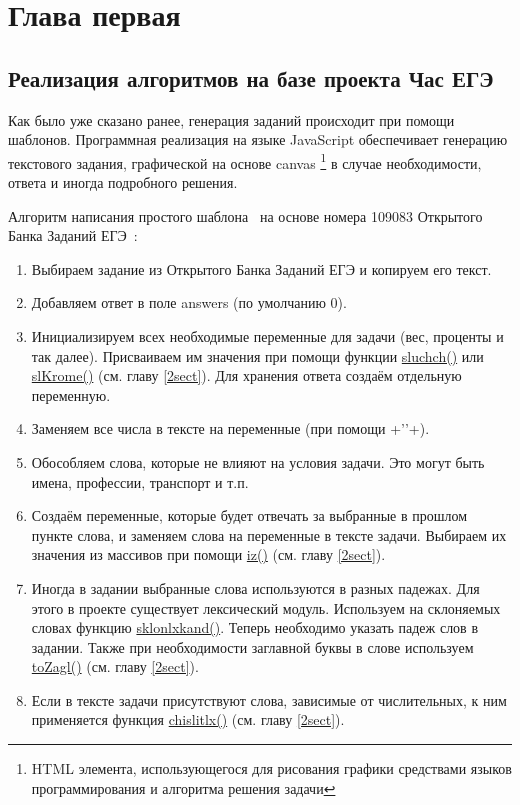 
\section{Глава первая}
\subsection{Реализация алгоритмов на базе проекта Час ЕГЭ}
Как было уже сказано ранее, генерация заданий происходит при помощи шаблонов.
Программная реализация на языке JavaScript обеспечивает генерацию текстового задания,
графической на основе canvas
\footnote{HTML элемента, использующегося для рисования графики средствами языков программирования и алгоритма решения задачи} в случае необходимости,
ответа и иногда подробного решения.

Алгоритм написания простого шаблона~\cite{chasi} на основе номера 109083 Открытого Банка Заданий ЕГЭ~\cite{fipi}:
\begin{enumerate}
    \item Выбираем задание из Открытого Банка Заданий ЕГЭ и копируем его текст.
    \item Добавляем ответ в поле answers (по умолчанию 0).
          
    \item Инициализируем всех необходимые переменные для задачи (вес, проценты и так далее).
          Присваиваем им значения при помощи функции \hyperlink{sluchch}{sluchch()} или
          \hyperlink{slKrome}{slKrome()} (см. главу \ref{2sect}). Для хранения ответа создаём отдельную переменную.
          
    \item Заменяем все числа в тексте на переменные (при помощи +'\cdot'+).
    \item Обособляем слова, которые не влияют на условия задачи. Это могут быть 
    имена, профессии, транспорт и т.п.
    \item Создаём переменные, которые будет отвечать за выбранные в прошлом пункте 
    слова, и заменяем слова на переменные в тексте задачи.
          Выбираем их значения из массивов при помощи \hyperlink{iz}{iz()} (см. главу \ref{2sect}).
    \item Иногда в задании выбранные слова используются в разных падежах. 
    Для этого в проекте существует лексический модуль. 
    Используем на склоняемых словах функцию \hyperlink{sklonlxkand}{sklonlxkand()}. 
    Теперь необходимо указать падеж слов в задании.
          Также при необходимости заглавной буквы в слове используем 
          \hyperlink{toZagl}{toZagl()} (см. главу \ref{2sect}).
    \item Если в тексте задачи присутствуют слова, зависимые от числительных, 
    к ним применяется функция \hyperlink{chislitlx}{chislitlx()} (см. главу \ref{2sect}).
          
\end{enumerate}

